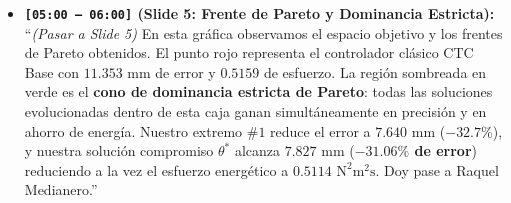 \documentclass[11pt,a4paper]{article}
\begin{document}
\begin{itemize}
    \item \textbf{\texttt{[05:00 -- 06:00]} (Slide 5: Frente de Pareto y Dominancia Estricta):} \\
    ``\textit{(Pasar a Slide 5)} En esta gráfica observamos el espacio objetivo y los frentes de Pareto obtenidos. El punto rojo representa el controlador clásico CTC Base con $11.353\text{ mm}$ de error y $0.5159$ de esfuerzo. La región sombreada en verde es el \textbf{cono de dominancia estricta de Pareto}: todas las soluciones evolucionadas dentro de esta caja ganan simultáneamente en precisión y en ahorro de energía. Nuestro extremo $\#1$ reduce el error a \textbf{$7.640\text{ mm}$} ($-32.7\%$), y nuestra solución compromiso $\theta^*$ alcanza \textbf{$7.827\text{ mm}$} (\textbf{$-31.06\%$ de error}) reduciendo a la vez el esfuerzo energético a $0.5114\text{ N}^2\text{m}^2\text{s}$. Doy pase a Raquel Medianero.''
\end{itemize}

\end{document}
